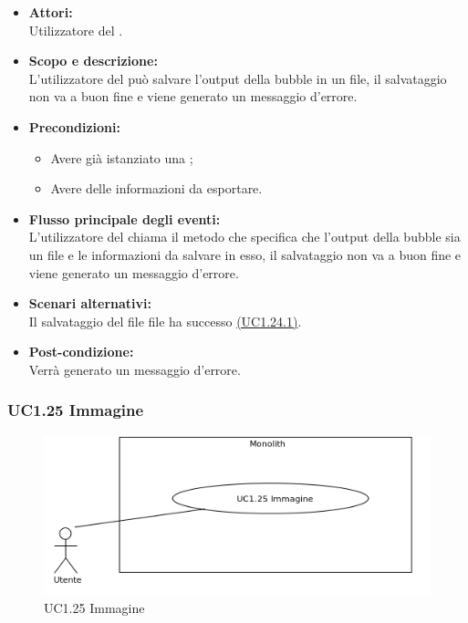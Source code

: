 \begin{itemize}
	\item \textbf{Attori:}
	\\Utilizzatore del .
	\item \textbf{Scopo e descrizione:} 
	\\L’utilizzatore del  può salvare l’output della bubble in un file, il salvataggio non va a buon fine e viene generato un messaggio d’errore.
	\item \textbf{Precondizioni:}
	\begin{itemize}
		\item Avere già istanziato una ;
		\item Avere delle informazioni da esportare.
	\end{itemize}
	\item \textbf{Flusso principale degli eventi:}
	\\L’utilizzatore del  chiama il metodo che specifica che l’output della bubble sia un file e le informazioni da salvare in esso,  il salvataggio non va a buon fine e viene generato un messaggio d’errore.
	\item \textbf{Scenari alternativi:}
	\\Il salvataggio del file file ha successo \hyperref[UC1.24.1]{(UC1.24.1)}.
	\item \textbf{Post-condizione:}
	\\Verrà generato un messaggio d’errore.
\end{itemize}

\subsubsection{UC1.25 Immagine} \label{UC1.25}

\begin{figure}[H]
	\centering
	\includegraphics[width=15cm]{../../documenti/AnalisiDeiRequisiti/Diagrammi_img/uc1_25.png}
	\caption{UC1.25 Immagine}
\end{figure}


